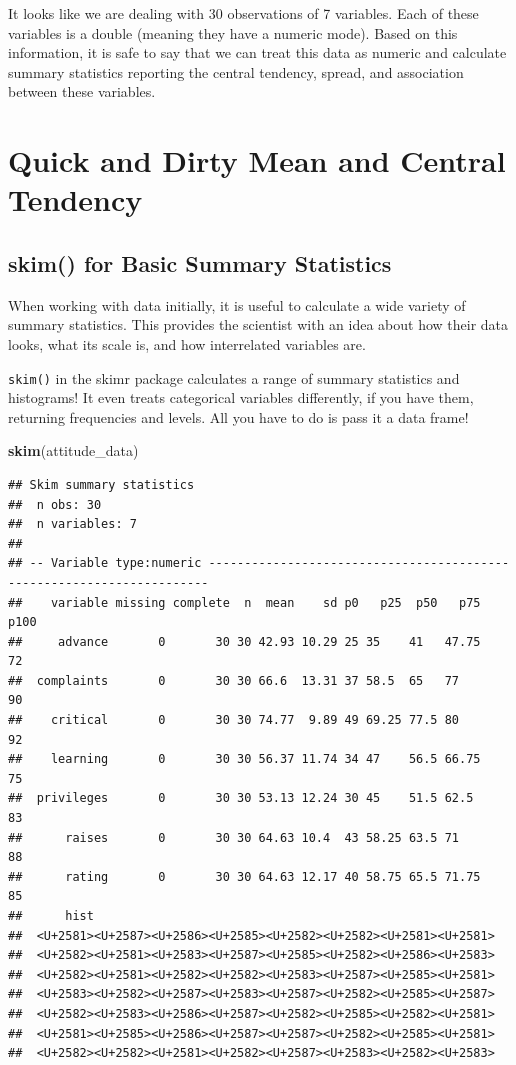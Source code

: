 \documentclass[]{book}
\newenvironment{Shaded}{\begin{snugshade}}{\end{snugshade}}
\newcommand{\KeywordTok}[1]{\textcolor[rgb]{0.13,0.29,0.53}{\textbf{#1}}}
\newcommand{\NormalTok}[1]{#1}
\theoremstyle{definition}
\theoremstyle{definition}
\theoremstyle{definition}
\theoremstyle{remark}
\begin{document}
It looks like we are dealing with 30 observations of 7 variables. Each of these variables is a double (meaning they have a numeric mode). Based on this information, it is safe to say that we can treat this data as numeric and calculate summary statistics reporting the central tendency, spread, and association between these variables.

\hypertarget{quick-and-dirty-mean-and-central-tendency}{%
\section{Quick and Dirty Mean and Central Tendency}\label{quick-and-dirty-mean-and-central-tendency}}

\hypertarget{skim-for-basic-summary-statistics}{%
\subsection{skim() for Basic Summary Statistics}\label{skim-for-basic-summary-statistics}}

When working with data initially, it is useful to calculate a wide variety of summary statistics. This provides the scientist with an idea about how their data looks, what its scale is, and how interrelated variables are.

\texttt{skim()} in the skimr package calculates a range of summary statistics and histograms! It even treats categorical variables differently, if you have them, returning frequencies and levels. All you have to do is pass it a data frame!

\begin{Shaded}
\begin{Highlighting}[]
\KeywordTok{skim}\NormalTok{(attitude_data)}
\end{Highlighting}
\end{Shaded}

\begin{verbatim}
## Skim summary statistics
##  n obs: 30 
##  n variables: 7 
## 
## -- Variable type:numeric ----------------------------------------------------------------------
##    variable missing complete  n  mean    sd p0   p25  p50   p75 p100
##     advance       0       30 30 42.93 10.29 25 35    41   47.75   72
##  complaints       0       30 30 66.6  13.31 37 58.5  65   77      90
##    critical       0       30 30 74.77  9.89 49 69.25 77.5 80      92
##    learning       0       30 30 56.37 11.74 34 47    56.5 66.75   75
##  privileges       0       30 30 53.13 12.24 30 45    51.5 62.5    83
##      raises       0       30 30 64.63 10.4  43 58.25 63.5 71      88
##      rating       0       30 30 64.63 12.17 40 58.75 65.5 71.75   85
##      hist
##  <U+2581><U+2587><U+2586><U+2585><U+2582><U+2582><U+2581><U+2581>
##  <U+2582><U+2581><U+2583><U+2587><U+2585><U+2582><U+2586><U+2583>
##  <U+2582><U+2581><U+2582><U+2582><U+2583><U+2587><U+2585><U+2581>
##  <U+2583><U+2582><U+2587><U+2583><U+2587><U+2582><U+2585><U+2587>
##  <U+2582><U+2583><U+2586><U+2587><U+2582><U+2585><U+2582><U+2581>
##  <U+2581><U+2585><U+2586><U+2587><U+2587><U+2582><U+2585><U+2581>
##  <U+2582><U+2582><U+2581><U+2582><U+2587><U+2583><U+2582><U+2583>
\end{verbatim}
\end{document}
